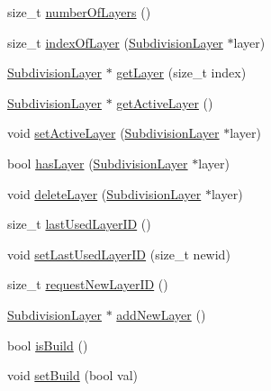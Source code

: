 \begin{DoxyCompactItemize}
\item 
size\-\_\-t \hyperlink{classShipCAD_1_1SubdivisionSurface_ad9d00dfc848975306c43305e13e57ebe}{number\-Of\-Layers} ()
\item 
size\-\_\-t \hyperlink{classShipCAD_1_1SubdivisionSurface_accb1e8604e44f491f84e9fb77d1ab5c7}{index\-Of\-Layer} (\hyperlink{classShipCAD_1_1SubdivisionLayer}{Subdivision\-Layer} $\ast$layer)
\item 
\hyperlink{classShipCAD_1_1SubdivisionLayer}{Subdivision\-Layer} $\ast$ \hyperlink{classShipCAD_1_1SubdivisionSurface_a24b230e51a0c5fb3e7f51d0e2340eb9f}{get\-Layer} (size\-\_\-t index)
\item 
\hyperlink{classShipCAD_1_1SubdivisionLayer}{Subdivision\-Layer} $\ast$ \hyperlink{classShipCAD_1_1SubdivisionSurface_a490d7a6fef79ba56fd36395208b46ba5}{get\-Active\-Layer} ()
\item 
void \hyperlink{classShipCAD_1_1SubdivisionSurface_a69bafa71111e562a52a089be99b47871}{set\-Active\-Layer} (\hyperlink{classShipCAD_1_1SubdivisionLayer}{Subdivision\-Layer} $\ast$layer)
\item 
bool \hyperlink{classShipCAD_1_1SubdivisionSurface_aef9fe9a74054b54292f7f64e0589743c}{has\-Layer} (\hyperlink{classShipCAD_1_1SubdivisionLayer}{Subdivision\-Layer} $\ast$layer)
\item 
void \hyperlink{classShipCAD_1_1SubdivisionSurface_a3f0dac49106056562a8b675c61918abe}{delete\-Layer} (\hyperlink{classShipCAD_1_1SubdivisionLayer}{Subdivision\-Layer} $\ast$layer)
\item 
size\-\_\-t \hyperlink{classShipCAD_1_1SubdivisionSurface_a46966d7372d20e563fddc48d6bbcab8a}{last\-Used\-Layer\-I\-D} ()
\item 
void \hyperlink{classShipCAD_1_1SubdivisionSurface_aa72a8cf7c5bddaaf24ec41ad3480fe70}{set\-Last\-Used\-Layer\-I\-D} (size\-\_\-t newid)
\item 
size\-\_\-t \hyperlink{classShipCAD_1_1SubdivisionSurface_a3af3a30b53d867b2b25f9ac9290a264a}{request\-New\-Layer\-I\-D} ()
\item 
\hyperlink{classShipCAD_1_1SubdivisionLayer}{Subdivision\-Layer} $\ast$ \hyperlink{classShipCAD_1_1SubdivisionSurface_a5bf8f452664e17dae636d4b66a66eba9}{add\-New\-Layer} ()
\item 
bool \hyperlink{classShipCAD_1_1SubdivisionSurface_a54b74c879ff3782b264e27a8d4fab368}{is\-Build} ()
\item 
void \hyperlink{classShipCAD_1_1SubdivisionSurface_aec5073750762d1f8c3ab2107a742f4a5}{set\-Build} (bool val)
\item 

\end{DoxyCompactItemize}
